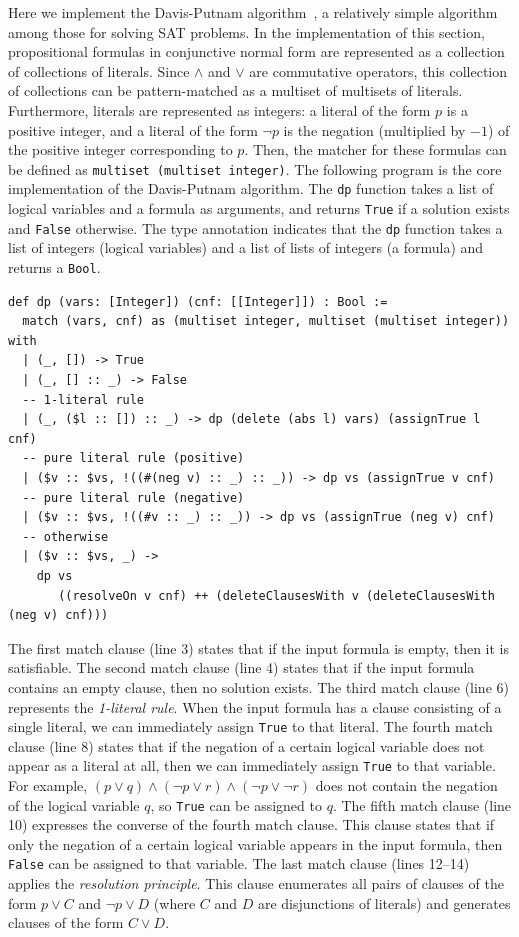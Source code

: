 Here we implement the Davis-Putnam algorithm~\cite{harrison2009handbook}, a relatively simple algorithm among those for solving SAT problems.
In the implementation of this section, propositional formulas in conjunctive normal form are represented as a collection of collections of literals.
Since $\wedge$ and $\lor$ are commutative operators, this collection of collections can be pattern-matched as a multiset of multisets of literals.
Furthermore, literals are represented as integers: a literal of the form $p$ is a positive integer, and a literal of the form $\neg p$ is the negation (multiplied by $-1$) of the positive integer corresponding to $p$.
Then, the matcher for these formulas can be defined as \lstinline{multiset (multiset integer)}.
The following program is the core implementation of the Davis-Putnam algorithm.
The \lstinline{dp} function takes a list of logical variables and a formula as arguments, and returns \lstinline{True} if a solution exists and \lstinline{False} otherwise.
The type annotation indicates that the \lstinline{dp} function takes a list of integers (logical variables) and a list of lists of integers (a formula) and returns a \lstinline{Bool}.
\begin{lstlisting}[language=egison]
def dp (vars: [Integer]) (cnf: [[Integer]]) : Bool :=
  match (vars, cnf) as (multiset integer, multiset (multiset integer)) with
  | (_, []) -> True
  | (_, [] :: _) -> False
  -- 1-literal rule
  | (_, ($l :: []) :: _) -> dp (delete (abs l) vars) (assignTrue l cnf)
  -- pure literal rule (positive)
  | ($v :: $vs, !((#(neg v) :: _) :: _)) -> dp vs (assignTrue v cnf)
  -- pure literal rule (negative)
  | ($v :: $vs, !((#v :: _) :: _)) -> dp vs (assignTrue (neg v) cnf)
  -- otherwise
  | ($v :: $vs, _) ->
    dp vs
       ((resolveOn v cnf) ++ (deleteClausesWith v (deleteClausesWith (neg v) cnf)))
\end{lstlisting}
The first match clause (line 3) states that if the input formula is empty, then it is satisfiable.
The second match clause (line 4) states that if the input formula contains an empty clause, then no solution exists.
The third match clause (line 6) represents the \emph{1-literal rule}.
When the input formula has a clause consisting of a single literal, we can immediately assign \lstinline{True} to that literal.
The fourth match clause (line 8) states that if the negation of a certain logical variable does not appear as a literal at all, then we can immediately assign \lstinline{True} to that variable.
For example, $(p \lor q) \wedge (\neg p \lor r) \wedge (\neg p \lor \neg r)$ does not contain the negation of the logical variable $q$, so \lstinline{True} can be assigned to $q$.
The fifth match clause (line 10) expresses the converse of the fourth match clause.
This clause states that if only the negation of a certain logical variable appears in the input formula, then \lstinline{False} can be assigned to that variable.
The last match clause (lines 12--14) applies the \emph{resolution principle}.
This clause enumerates all pairs of clauses of the form $p \lor C$ and $\neg p \lor D$ (where $C$ and $D$ are disjunctions of literals) and generates clauses of the form $C \lor D$.

